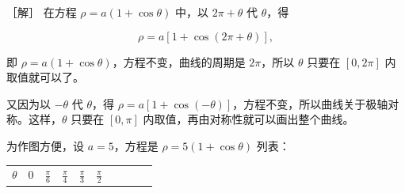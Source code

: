 ［解］ 在方程 \(\rho = a(1 + \cos \theta)\) 中，以 \(2\pi + \theta\) 代
\(\theta\)，得

\[
\rho = a [ 1 + \cos (2 \pi + \theta) ],
\]

即 \(\rho = a(1 + \cos \theta)\)，方程不变，曲线的周期是 \(2\pi\)，所以
\(\theta\) 只要在 \([0, 2\pi]\) 内取值就可以了。

又因为以 \(-\theta\) 代 \(\theta\)，得
\(\rho = a[1 + \cos (-\theta)]\)，方程不变，所以曲线关于极轴对称。这样，\(\theta\)
只要在 \([0, \pi]\) 内取值，再由对称性就可以画出整个曲线。

为作图方便，设 \(a = 5\)，方程是 \(\rho = 5(1 + \cos \theta)\) 列表：

{\def\LTcaptype{none} %
\begin{longtable}[]{@{}
  >{\raggedright\arraybackslash}p{}
  >{\raggedright\arraybackslash}p{}
  >{\raggedright\arraybackslash}p{}
  >{\raggedright\arraybackslash}p{}
  >{\raggedright\arraybackslash}p{}
  >{\raggedright\arraybackslash}p{}
  >{\raggedright\arraybackslash}p{}
  >{\raggedright\arraybackslash}p{}
  >{\raggedright\arraybackslash}p{}
  >{\raggedright\arraybackslash}p{}@{}}
\toprule\noalign{}
\begin{minipage}[b]{\linewidth}\raggedright
\(\theta\)
\end{minipage} & \begin{minipage}[b]{\linewidth}\raggedright
0
\end{minipage} & \begin{minipage}[b]{\linewidth}\raggedright
\(\frac{\pi}{6}\)
\end{minipage} & \begin{minipage}[b]{\linewidth}\raggedright
\(\frac{\pi}{4}\)
\end{minipage} & \begin{minipage}[b]{\linewidth}\raggedright
\(\frac{\pi}{3}\)
\end{minipage} & \begin{minipage}[b]{\linewidth}\raggedright
\(\frac{\pi}{2}\)
\end{minipage} & \begin{minipage}[b]{\linewidth}\raggedright

\end{minipage}
\end{longtable}}
